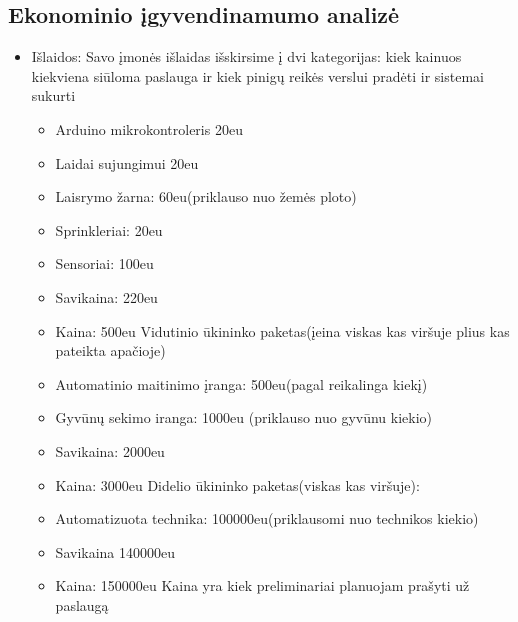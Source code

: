 \documentclass[oneside]{VUMIFPSkursinis}
\begin{document}
	\subsection{Ekonominio įgyvendinamumo analizė}
	\begin{itemize}
		\item{Išlaidos: Savo įmonės išlaidas išskirsime į dvi kategorijas: kiek kainuos kiekviena siūloma paslauga ir kiek pinigų reikės verslui pradėti ir sistemai sukurti}
		\begin{itemize}
			Siulomos paslaugos ir jū išlaidos:
			\newline
			Mažo ūkininko paketas
			\item{Arduino mikrokontroleris 20eu}
			\item{Laidai sujungimui 20eu}
			\item{Laisrymo žarna: 60eu(priklauso nuo žemės ploto)}
			\item{Sprinkleriai: 20eu}
			\item{Sensoriai: 100eu}
			\item{Savikaina: 220eu}	
			\item{Kaina: 500eu}
			\newline
			Vidutinio ūkininko paketas(įeina viskas kas viršuje plius kas pateikta apačioje)
			\item{Automatinio maitinimo įranga: 500eu(pagal reikalinga kiekį)}
			\item{Gyvūnų sekimo iranga: 1000eu (priklauso nuo gyvūnu kiekio)}
			\item{Savikaina: 2000eu}
			\item{Kaina: 3000eu}
			\newline
			Didelio ūkininko paketas(viskas kas viršuje):
			\item{Automatizuota technika: 100000eu(priklausomi nuo technikos kiekio)}
			\item{Savikaina 140000eu}
			\item{Kaina: 150000eu}
			\newline
			Kaina yra kiek preliminariai planuojam prašyti už paslaugą
			

\end{itemize}
\end{itemize}
\end{document}

